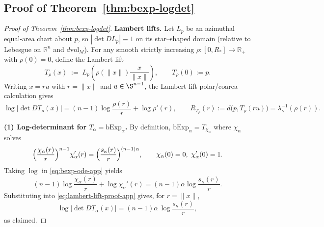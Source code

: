 \documentclass{article}
\newcommand{\R}{\mathbb{R}}
\theoremstyle{definition}
\theoremstyle{remark}
\begin{document}
\subsection{Proof of Theorem~\ref{thm:bexp-logdet}}

\begin{proof}[Proof of Theorem~\ref{thm:bexp-logdet}]
\textbf{Lambert lifts.}
Let $L_p$ be an azimuthal equal-area chart about $p$, so $|\det DL_p|\equiv 1$ on its star--shaped
domain (relative to Lebesgue on $\R^n$ and $d\mathrm{vol}_M$).  For any smooth strictly increasing
$\rho:[0,R_\ast]\to\R_+$ with $\rho(0)=0$, define the Lambert lift
\[
T_\rho(x)\;:=\;L_p\!\left(\rho(\|x\|)\frac{x}{\|x\|}\right),\qquad T_\rho(0):=p.
\]
Writing $x=ru$ with $r=\|x\|$ and $u\in\S^{n-1}$, the Lambert-lift polar/coarea calculation gives
\begin{equation}\label{eq:lambert-lift-proof-app}
\log\bigl|\det DT_\rho(x)\bigr|
=(n-1)\log\frac{\rho(r)}{r}+\log \rho'(r),
\qquad
R_{T_\rho}(r):=d\!\bigl(p,T_\rho(ru)\bigr)=\lambda_\kappa^{-1}(\rho(r)).
\end{equation}

\textbf{(1) Log-determinant for $T_\alpha=\mathrm{bExp}_\alpha$.}
By definition, $\mathrm{bExp}_\alpha=T_{\chi_\alpha}$ where $\chi_\alpha$ solves
\begin{equation}\label{eq:bexp-ode-app}
\Bigl(\frac{\chi_\alpha(r)}{r}\Bigr)^{n-1}\chi_\alpha'(r)
=\Bigl(\frac{s_\kappa(r)}{r}\Bigr)^{(n-1)\alpha},
\qquad \chi_\alpha(0)=0,\ \chi_\alpha'(0)=1 .
\end{equation}
Taking $\log$ in \eqref{eq:bexp-ode-app} yields
\[
(n-1)\log\frac{\chi_\alpha(r)}{r}+\log\chi_\alpha'(r)
=(n-1)\alpha\log\frac{s_\kappa(r)}{r}.
\]
Substituting into \eqref{eq:lambert-lift-proof-app} gives, for $r=\|x\|$,
\[
\log\bigl|\det DT_\alpha(x)\bigr|=(n-1)\alpha\,\log\frac{s_\kappa(r)}{r},
\]
as claimed.


\end{proof}
\end{document}
